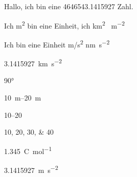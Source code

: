 \documentclass[12pt,ngerman]{scrartcl}
\begin{document}
Hallo, ich bin eine \num{4646543,1415927} Zahl.

Ich \si{m^2} bin eine Einheit, ich \si{\kilo\m^2} \si{\kilo\per m^2}

Ich bin eine Einheit \si{\meter/\second^2} \si{\nano\meter\per\second^2}

\SI{3.1415927}{\kilo\meter\per\second^2}

\ang{90}

\SIrange{10}{20}{\meter}

\numrange{10}{20}

\numlist{10;20;30;40}

\qty[per-mode = fraction]{1,345}{\coulomb\per\mole}


\SI[per-mode = fraction]{3.1415927}{\meter\per\second^2}
\end{document}
